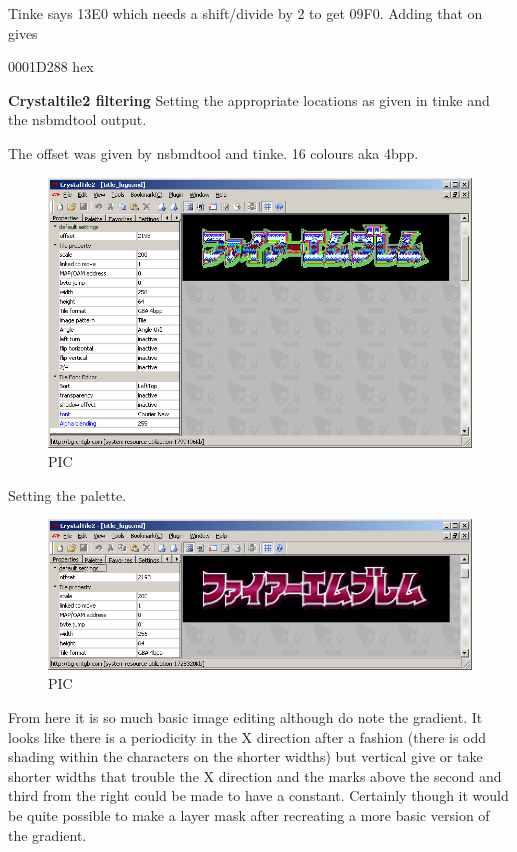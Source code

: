 \documentclass[
]{book}
\begin{document}
Tinke says 13E0 which needs a shift/divide by 2 to get 09F0. Adding that on gives

0001D288 hex

\textbf{Crystaltile2 filtering} Setting the appropriate locations as given in tinke and the nsbmdtool output.

The offset was given by nsbmdtool and tinke. 16 colours aka 4bpp.

\begin{figure}
\centering
\includegraphics{images/75_home_fast6191_romhackingguide_unrenamed_file___gguidegraphics3dminorNSMBDtexturedecoding_6.png}
\caption{PIC}
\end{figure}

Setting the palette.

\begin{figure}
\centering
\includegraphics{images/76_home_fast6191_romhackingguide_unrenamed_file___degraphics3dminorNSMBDtexturedecoding_6_pal.png}
\caption{PIC}
\end{figure}

From here it is so much basic image editing although do note the gradient. It looks like there is a periodicity in the X direction after a fashion (there is odd shading within the characters on the shorter widths) but vertical give or take shorter widths that trouble the X direction and the marks above the second and third from the right could be made to have a constant. Certainly though it would be quite possible to make a layer mask after recreating a more basic version of the gradient.
\end{document}
